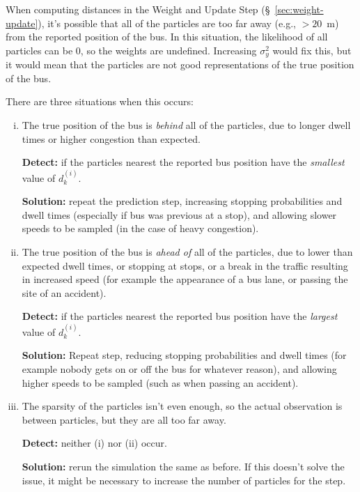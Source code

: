 \documentclass[10pt,a4paper]{article}
\begin{document}
When computing distances in the Weight and Update Step (\S~\ref{sec:weight-update}),
it's possible that all of the particles are too far away (e.g., $>20$~m) from the 
reported position of the bus. In this situation, the likelihood of all particles
can be 0, so the weights are undefined. 
Increasing $\sigma_y^2$ would fix this, but it would mean that the particles are not 
good representations of the true position of the bus.



There are three situations when this occurs:
\begin{enumerate}[(i)]
\item 
  The true position of the bus is \emph{behind} all of the particles, due to longer dwell times
  or higher congestion than expected.

  \textbf{Detect:} if the particles nearest the reported bus position have the \emph{smallest}
  value of $d_k^{(i)}$.

  \textbf{Solution:} repeat the prediction step, increasing stopping probabilities and dwell times
  (especially if bus was previous at a stop),
  and allowing slower speeds to be sampled (in the case of heavy congestion).

\item 
  The true position of the bus is \emph{ahead of} all of the particles, due to lower than expected dwell
  times, or stopping at stops, or a break in the traffic resulting in increased speed (for example the
  appearance of a bus lane, or passing the site of an accident).

  \textbf{Detect:} if the particles nearest the reported bus position have the \emph{largest}
  value of $d_k^{(i)}$.

  \textbf{Solution:} Repeat step, reducing stopping probabilities and dwell times (for example nobody gets on or off 
  the bus for whatever reason), 
  and allowing higher speeds to be sampled (such as when passing an accident).

\item 
  The sparsity of the particles isn't even enough, so the actual observation is between particles, but they 
  are all too far away.

  \textbf{Detect:} neither (i) nor (ii) occur.

  \textbf{Solution:} rerun the simulation the same as before. If this doesn't solve the issue, it might be necessary
  to increase the number of particles for the step.
\end{enumerate}
\end{document}
